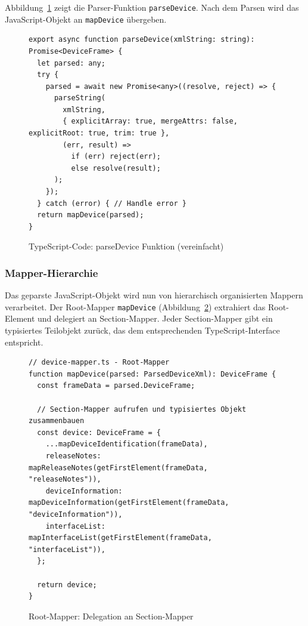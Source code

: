 \documentclass[a4paper,12pt]{article}
\newcommand{\code}[1]{\texttt{#1}}
\begin{document}
\noindent Abbildung~\ref{fig:xml2js-mapper} zeigt die Parser-Funktion \code{parseDevice}. Nach dem 
Parsen wird das JavaScript-Objekt an \code{mapDevice} übergeben.

\begin{figure}[H]
    \centering
    \begin{lstlisting}[language=typescriptselective,frame=single,backgroundcolor=\color{gray!10},basicstyle=\ttfamily\scriptsize,breaklines=true]
export async function parseDevice(xmlString: string): Promise<DeviceFrame> {
  let parsed: any;
  try {
    parsed = await new Promise<any>((resolve, reject) => {
      parseString(
        xmlString,
        { explicitArray: true, mergeAttrs: false, explicitRoot: true, trim: true },
        (err, result) => 
          if (err) reject(err);
          else resolve(result);
      );
    });
  } catch (error) { // Handle error }
  return mapDevice(parsed);
}
    \end{lstlisting}
    \caption{TypeScript-Code: parseDevice Funktion (vereinfacht)}
    \label{fig:xml2js-mapper}
\end{figure}

\newpage

\subsubsection{Mapper-Hierarchie}

Das geparste JavaScript-Objekt wird nun von hierarchisch organisierten Mappern verarbeitet. Der 
Root-Mapper \code{mapDevice} (Abbildung~\ref{fig:mapper-hierarchy}) extrahiert das Root-Element 
und delegiert an Section-Mapper. Jeder Section-Mapper gibt ein typisiertes Teilobjekt zurück, das 
dem entsprechenden TypeScript-Interface entspricht.

\begin{figure}[H]
    \centering
    \begin{lstlisting}[language=typescriptselective,frame=single,backgroundcolor=\color{gray!10},basicstyle=\ttfamily\scriptsize,breaklines=true]
// device-mapper.ts - Root-Mapper
function mapDevice(parsed: ParsedDeviceXml): DeviceFrame {
  const frameData = parsed.DeviceFrame;
  
  // Section-Mapper aufrufen und typisiertes Objekt zusammenbauen
  const device: DeviceFrame = {
    ...mapDeviceIdentification(frameData),
    releaseNotes: mapReleaseNotes(getFirstElement(frameData, "releaseNotes")),
    deviceInformation: mapDeviceInformation(getFirstElement(frameData, "deviceInformation")),
    interfaceList: mapInterfaceList(getFirstElement(frameData, "interfaceList")),
  };
  
  return device;
}
    \end{lstlisting}
    \caption{Root-Mapper: Delegation an Section-Mapper}
    \label{fig:mapper-hierarchy}
\end{figure}
\end{document}
